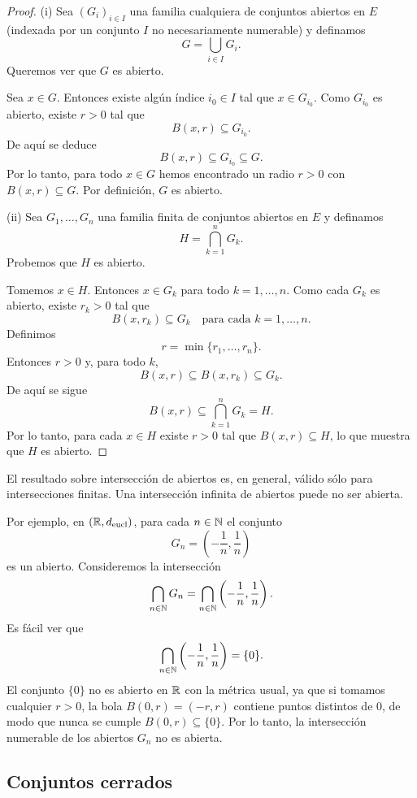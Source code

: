 \begin{proof}
(i) Sea $(G_i)_{i\in I}$ una familia cualquiera de conjuntos abiertos en $E$
(indexada por un conjunto $I$ no necesariamente numerable) y definamos
\[
G = \bigcup_{i\in I} G_i.
\]
Queremos ver que $G$ es abierto.

Sea $x \in G$. Entonces existe algún índice $i_0 \in I$ tal que
$x \in G_{i_0}$. Como $G_{i_0}$ es abierto, existe $r>0$ tal que
\[
B(x,r) \subseteq G_{i_0}.
\]
De aquí se deduce
\[
B(x,r) \subseteq G_{i_0} \subseteq G.
\]
Por lo tanto, para todo $x \in G$ hemos encontrado un radio $r>0$ con
$B(x,r) \subseteq G$. Por definición, $G$ es abierto.

\medskip

(ii) Sea $G_1,\dots,G_n$ una familia finita de conjuntos abiertos en $E$
y definamos
\[
H = \bigcap_{k=1}^n G_k.
\]
Probemos que $H$ es abierto.

Tomemos $x \in H$. Entonces $x \in G_k$ para todo $k=1,\dots,n$.
Como cada $G_k$ es abierto, existe $r_k > 0$ tal que
\[
B(x,r_k) \subseteq G_k
\quad \text{para cada } k=1,\dots,n.
\]
Definimos
\[
r = \min\{r_1,\dots,r_n\}.
\]
Entonces $r > 0$ y, para todo $k$,
\[
B(x,r) \subseteq B(x,r_k) \subseteq G_k.
\]
De aquí se sigue
\[
B(x,r) \subseteq \bigcap_{k=1}^n G_k = H.
\]
Por lo tanto, para cada $x \in H$ existe $r>0$ tal que
$B(x,r) \subseteq H$, lo que muestra que $H$ es abierto.
\end{proof}

\begin{obs}
El resultado sobre intersección de abiertos es, en general, válido sólo
para intersecciones finitas. Una intersección infinita de abiertos puede
no ser abierta.

Por ejemplo, en $(\mathbb{R},d_{\text{eucl}})$, para cada $n \in \mathbb{N}$ el conjunto
\[
G_n = \left(-\frac{1}{n}, \frac{1}{n}\right)
\]
es un abierto. Consideremos la intersección
\[
\bigcap_{n\in\mathbb{N}} G_n
= \bigcap_{n\in\mathbb{N}} \left(-\frac{1}{n}, \frac{1}{n}\right).
\]
Es fácil ver que
\[
\bigcap_{n\in\mathbb{N}} \left(-\frac{1}{n}, \frac{1}{n}\right) = \{0\}.
\]
El conjunto $\{0\}$ no es abierto en $\mathbb{R}$ con la métrica usual, ya que si
tomamos cualquier $r>0$, la bola $B(0,r) = (-r,r)$ contiene puntos distintos
de $0$, de modo que nunca se cumple $B(0,r) \subseteq \{0\}$.
Por lo tanto, la intersección numerable de los abiertos $G_n$ no es abierta.
\end{obs}

\subsection{Conjuntos cerrados}

